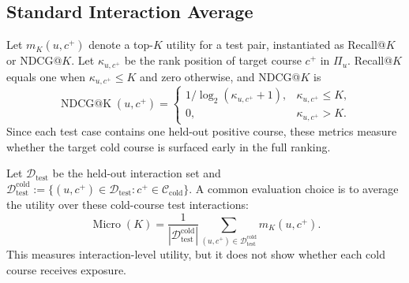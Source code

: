 \documentclass[letterpaper]{article}
\begin{document}
\subsection{Standard Interaction Average}
Let \(m_K(u,c^+)\) denote a top-\(K\) utility for a test pair, instantiated as Recall@\(K\) or NDCG@\(K\). Let \(\kappa_{u,c^+}\) be the rank position of target course \(c^+\) in \(\Pi_u\). Recall@\(K\) equals one when \(\kappa_{u,c^+}\le K\) and zero otherwise, and NDCG@\(K\) is
\begin{equation}
\operatorname{NDCG@K}(u,c^+)=
\begin{cases}
1/\log_2(\kappa_{u,c^+}+1), & \kappa_{u,c^+}\le K,\\
0, & \kappa_{u,c^+}>K.
\end{cases}
\label{eq:topk-utility}
\end{equation}
Since each test case contains one held-out positive course, these metrics measure whether the target cold course is surfaced early in the full ranking.

Let \(\mathcal{D}_{\mathrm{test}}\) be the held-out interaction set and \(\mathcal{D}^{\mathrm{cold}}_{\mathrm{test}}:=\{(u,c^+)\in\mathcal{D}_{\mathrm{test}}:c^+\in\mathcal{C}_{\mathrm{cold}}\}\). A common evaluation choice is to average the utility over these cold-course test interactions:
\begin{equation}
\operatorname{Micro}(K)=
\frac{1}{|\mathcal{D}^{\mathrm{cold}}_{\mathrm{test}}|}
\sum_{(u,c^+)\in \mathcal{D}^{\mathrm{cold}}_{\mathrm{test}}}
m_K(u,c^+).
\end{equation}
This measures interaction-level utility, but it does not show whether each cold course receives exposure.
\end{document}
